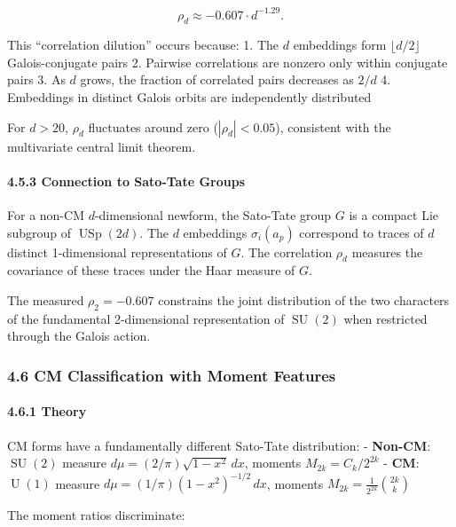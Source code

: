 \documentclass[
]{article}
\begin{document}
\[\rho_d \approx -0.607 \cdot d^{-1.29}.\]

This ``correlation dilution'' occurs because: 1. The \(d\) embeddings
form \(\lfloor d/2 \rfloor\) Galois-conjugate pairs 2. Pairwise
correlations are nonzero only within conjugate pairs 3. As \(d\) grows,
the fraction of correlated pairs decreases as \(2/d\) 4. Embeddings in
distinct Galois orbits are independently distributed

For \(d > 20\), \(\rho_d\) fluctuates around zero (\(|\rho_d| < 0.05\)),
consistent with the multivariate central limit theorem.

\hypertarget{connection-to-sato-tate-groups}{%
\paragraph{4.5.3 Connection to Sato-Tate
Groups}\label{connection-to-sato-tate-groups}}

For a non-CM \(d\)-dimensional newform, the Sato-Tate group \(G\) is a
compact Lie subgroup of \(\operatorname{USp}(2d)\). The \(d\) embeddings
\(\sigma_i(a_p)\) correspond to traces of \(d\) distinct 1-dimensional
representations of \(G\). The correlation \(\rho_d\) measures the
covariance of these traces under the Haar measure of \(G\).

The measured \(\rho_2 = -0.607\) constrains the joint distribution of
the two characters of the fundamental 2-dimensional representation of
\(\operatorname{SU}(2)\) when restricted through the Galois action.

\hypertarget{cm-classification-with-moment-features}{%
\subsubsection{4.6 CM Classification with Moment
Features}\label{cm-classification-with-moment-features}}

\hypertarget{theory}{%
\paragraph{4.6.1 Theory}\label{theory}}

CM forms have a fundamentally different Sato-Tate distribution: -
\textbf{Non-CM}: \(\operatorname{SU}(2)\) measure
\(d\mu = (2/\pi)\sqrt{1-x^2}\,dx\), moments \(M_{2k} = C_k/2^{2k}\) -
\textbf{CM}: \(\operatorname{U}(1)\) measure
\(d\mu = (1/\pi)(1-x^2)^{-1/2}\,dx\), moments
\(M_{2k} = \frac{1}{2^{2k}}\binom{2k}{k}\)

The moment ratios discriminate:
\end{document}
